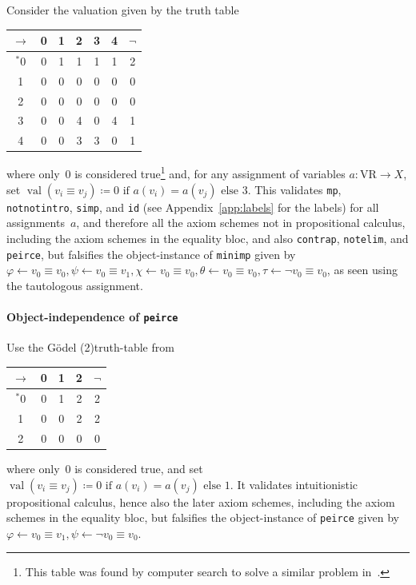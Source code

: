 \documentclass[11pt]{article}
\renewcommand*{\phi}{\varphi}
\newcommand*{\VR}{\mathrm{VR}}
\DeclareMathOperator{\val}{val}
\theoremstyle{plain}
\theoremstyle{definition}
\theoremstyle{remark}
\begin{document}
Consider the valuation given by the truth table
\begin{center}
\begin{tabular}{|c|ccccc|c|}
\hline
$\to$&0&1&2&3&4&$\neg$\\
\hline
$^*$0\phantom{$^*$}&0&1&1&1&1&2\\
1&0&0&0&0&0&0\\
2&0&0&0&0&0&0\\
3&0&0&4&0&4&1\\
4&0&0&3&3&0&1\\
\hline
\end{tabular}
\end{center}
where only~0 is considered true\rlap{,}\footnote{This table was found by computer search to solve a
similar problem in~\cite{jubin}.} and, for any assignment of variables $a\colon \VR \to X$, set
$\val(v_i \equiv v_j) \coloneqq 0 \text{ if $a(v_i) = a(v_j)$ else } 3$.
This validates \texttt{mp}, \texttt{notnotintro}, \texttt{simp}, and \texttt{id} (see
Appendix~\ref{app:labels} for the labels) for all assignments~$a$, and therefore all the axiom schemes not
in propositional calculus, including the axiom schemes in the equality bloc, and also \texttt{contrap},
\texttt{notelim}, and \texttt{peirce}, but falsifies the object-instance of \texttt{minimp} given by
$\phi \leftarrow v_0 \equiv v_0,
 \psi \leftarrow v_0 \equiv v_1,
 \chi \leftarrow v_0 \equiv v_0,
 \theta \leftarrow v_0 \equiv v_0,
 \tau \leftarrow \neg v_0 \equiv v_0$,
as seen using the tautologous assignment.


\paragraph{Object-independence of \texttt{peirce}}

Use the G\"odel (2)truth-table from~\cite{robinson}
\begin{center}
\begin{tabular}{|c|ccc|c|}
\hline
$\to$&0&1&2&$\neg$\\
\hline
$^*$0\phantom{$^*$}&0&1&2&2\\
1&0&0&2&2\\
2&0&0&0&0\\
\hline
\end{tabular}
\end{center}
where only~0 is considered true, and set
$\val(v_i \equiv v_j) \coloneqq 0 \text{ if $a(v_i) = a(v_j)$ else } 1$.
It validates intuitionistic propositional calculus, hence also the later axiom schemes, including
the axiom schemes in the equality bloc, but falsifies the object-instance of \texttt{peirce} given
by $\phi \leftarrow v_0 \equiv v_1, \psi \leftarrow \neg v_0 \equiv v_0$.
\end{document}
